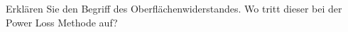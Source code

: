 \begin{question}[section=5,name={Oberflächenwiderstand},difficulty=,quantity=,type=thr,tags={20130724,20130314}]
	Erklären Sie den Begriff des Oberflächenwiderstandes. Wo tritt dieser bei der Power Loss Methode auf?
	
	
\end{question}
\begin{solution}
	
\end{solution}